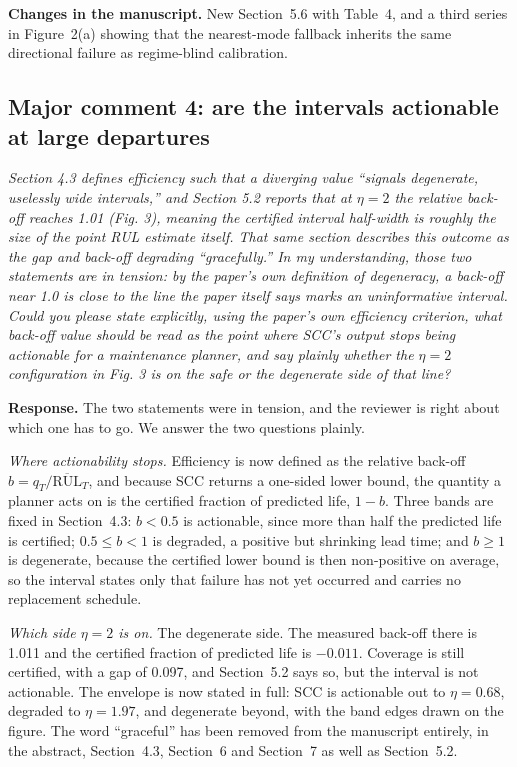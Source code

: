 \documentclass[11pt,a4paper]{article}
\newenvironment{comment}
  {\begin{list}{}{\leftmargin=6mm \rightmargin=2mm}\item[]\color{quoteline}\itshape}
  {\end{list}}
\newcommand{\where}[1]{\textbf{Changes in the manuscript.} #1}
\begin{document}
\where{New Section~5.6 with Table~4, and a third series in Figure~2(a) showing that the nearest-mode
fallback inherits the same directional failure as regime-blind calibration.}

\subsection*{Major comment 4: are the intervals actionable at large departures}
\begin{comment}
Section 4.3 defines efficiency such that a diverging value ``signals degenerate, uselessly wide
intervals,'' and Section 5.2 reports that at $\eta = 2$ the relative back-off reaches 1.01
(Fig. 3), meaning the certified interval half-width is roughly the size of the point RUL estimate
itself. That same section describes this outcome as the gap and back-off degrading ``gracefully.''
In my understanding, those two statements are in tension: by the paper's own definition of
degeneracy, a back-off near 1.0 is close to the line the paper itself says marks an uninformative
interval. Could you please state explicitly, using the paper's own efficiency criterion, what
back-off value should be read as the point where SCC's output stops being actionable for a
maintenance planner, and say plainly whether the $\eta = 2$ configuration in Fig. 3 is on the safe
or the degenerate side of that line?
\end{comment}

\noindent\textbf{Response.} The two statements were in tension, and the reviewer is right about
which one has to go. We answer the two questions plainly.

\emph{Where actionability stops.} Efficiency is now defined as the relative back-off
$b=q_T/\overline{\mathrm{RUL}}_T$, and because SCC returns a one-sided lower bound, the quantity a
planner acts on is the certified fraction of predicted life, $1-b$. Three bands are fixed in
Section~4.3: $b<0.5$ is actionable, since more than half the predicted life is certified;
$0.5\le b<1$ is degraded, a positive but shrinking lead time; and $b\ge1$ is degenerate, because the
certified lower bound is then non-positive on average, so the interval states only that failure has
not yet occurred and carries no replacement schedule.

\emph{Which side $\eta=2$ is on.} The degenerate side. The measured back-off there is 1.011 and the
certified fraction of predicted life is $-0.011$. Coverage is still certified, with a gap of 0.097,
and Section~5.2 says so, but the interval is not actionable. The envelope is now stated in full: SCC
is actionable out to $\eta=0.68$, degraded to $\eta=1.97$, and degenerate beyond, with the band
edges drawn on the figure. The word ``graceful'' has been removed from the manuscript entirely, in
the abstract, Section~4.3, Section~6 and Section~7 as well as Section~5.2.
\end{document}

